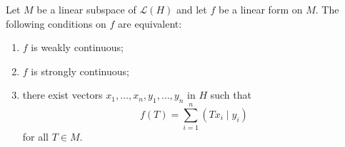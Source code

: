 \begin{proposition}
Let $M$ be a linear subspace of $\mathcal{L}(H)$ and let $f$ be a linear form on $M$. The following conditions on $f$ are equivalent:
\begin{enumerate}
\item[(a)] $f$ is weakly continuous;
\item[(b)] $f$ is strongly continuous;
\item[(c)] there exist vectors $x_1, \ldots, x_n, y_1, \ldots, y_n$ in $H$ such that
$$f(T) = \sum_{i=1}^{n} (Tx_i \mid y_i)$$
for all $T \in M$.
\end{enumerate}
\end{proposition}

